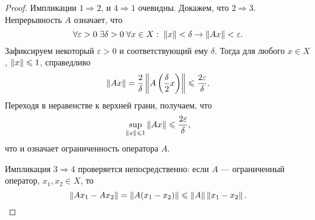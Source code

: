 \begin{proof}
    Импликации $1 \Rightarrow 2$, и $4 \Rightarrow 1$ очевидны.
    Докажем, что $2 \Rightarrow 3$.
    Непрерывность $A$ означает, что
    \[ \forall \varepsilon > 0 \; \exists \delta > 0 \; \forall x \in X: \; \left\|x\right\| <
    \delta \rightarrow \left\|Ax\right\| < \varepsilon. \]
    Зафиксируем некоторый $\varepsilon > 0$ и соответствующий ему $\delta$.
    Тогда для любого $x \in X$, $\left\|x\right\| \leqslant
    1$, справедливо
    \[ \left\|Ax\right\| = \frac{2}{\delta} \left\|A\left( \frac{\delta}{2} x \right)\right\|
    \leqslant \frac{2\varepsilon}{\delta}. \]
    Переходя в неравенстве к верхней грани, получаем, что
    \[ \sup_{\left\|x\right\| \leqslant 1}\left\|Ax\right\| \leqslant \frac{2\varepsilon}{\delta}, \]
    что и означает ограниченность оператора $A$.

    Импликация $3 \Rightarrow 4$ проверяется непосредственно: если $A$ ---
    ограниченный оператор, $x_1, x_2 \in X$, то
    \[ \left\|Ax_1 - Ax_2\right\| = \left\|A(x_1 - x_2)\right\| \leqslant \left\|A\right\| \left\|x_1 - x_2\right\|.
    \]
\end{proof}
